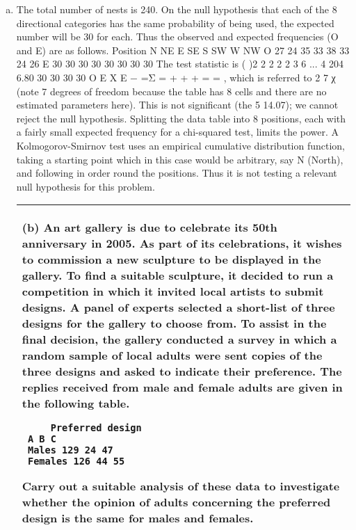 \documentclass[a4paper,12pt]{article}
\begin{document}
\begin{enumerate}[(a)]
\item  The total number of nests is 240. On the null hypothesis that each of the 8
directional categories has the same probability of being used, the expected number
will be 30 for each. Thus the observed and expected frequencies (O and E) are as
follows.
Position N NE E SE S SW W NW
O 27 24 35 33 38 33 24 26
E 30 30 30 30 30 30 30 30
The test statistic is
( )2 2 2 2
2 3 6 ... 4 204 6.80
30 30 30 30
O E
X
E
−
=Σ = + + + = = ,
which is referred to 2
7 χ (note 7 degrees of freedom because the table has 8 cells and
there are no estimated parameters here). This is not significant (the 5%
14.07); we cannot reject the null hypothesis.
Splitting the data table into 8 positions, each with a fairly small expected frequency
for a chi-squared test, limits the power.
A Kolmogorov-Smirnov test uses an empirical cumulative distribution function,
taking a starting point which in this case would be arbitrary, say N (North), and
following in order round the positions. Thus it is not testing a relevant null hypothesis
for this problem.

\newpage
\begin{table}[ht!]
 
\centering
 
\begin{tabular}{|p{15cm}|}
 
\hline
 (b) An art gallery is due to celebrate its 50th anniversary in 2005.  As part of its celebrations, it wishes to commission a new sculpture to be displayed in the gallery.  To find a suitable sculpture, it decided to run a competition in which it invited local artists to submit designs.  A panel of experts selected a short-list of three designs for the gallery to choose from.  To assist in the final decision, the gallery conducted a survey in which a random sample of local adults were sent copies of the three designs and asked to indicate their preference.  The replies received from male and female adults are given in the following table. 
\begin{verbatim}
     Preferred design  
 A B C
 Males 129 24 47 
 Females 126 44 55
\end{verbatim} 
 
Carry out a suitable analysis of these data to investigate whether the opinion of adults 
concerning the preferred design is the same for males and females.  
\\ \hline
  

\end{tabular}
\end{table}
\end{enumerate}
\end{document}
